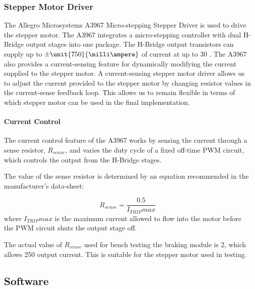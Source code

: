 \subsubsection{Stepper Motor Driver}

The Allegro Microsystems A3967 Micro-stepping Stepper Driver is used to drive the stepper motor. The A3967 integrates a micro-stepping controller with dual H-Bridge output stages into one package. The H-Bridge output transistors can supply up to $\pm\unit{750}{\milli\ampere}$ of current at up to \unit{30}{\volt} \cite{A3967}. The A3967 also provides a current-sensing feature for dynamically modifying the current supplied to the stepper motor. A current-sensing stepper motor driver allows us to adjust the current provided to the stepper motor by changing resistor values in the current-sense feedback loop. This allows us to remain flexible in terms of which stepper motor can be used in the final implementation.

\paragraph{Current Control}


The current control feature of the A3967 works by sensing the current through a sense resistor, $R_{sense}$, and varies the duty cycle of a fixed off-time PWM circuit, which controls the output from the H-Bridge stages.

The value of the sense resistor is determined by an equation recommended in the manufacturer's data-sheet:

\begin{equation}
R_{sense}=\frac{0.5}{I_{TRIP}max}
\end{equation}
where $I_{TRIP}max$ is the maximum current allowed to flow into the motor before the PWM circuit shuts the output stage off.

The actual value of $R_{sense}$ used for bench testing the braking module is \unit{2}{\ohm}, which allows \unit{250}{\milli\ampere} output current. This is suitable for the stepper motor used in testing.

\subsection{Software}

